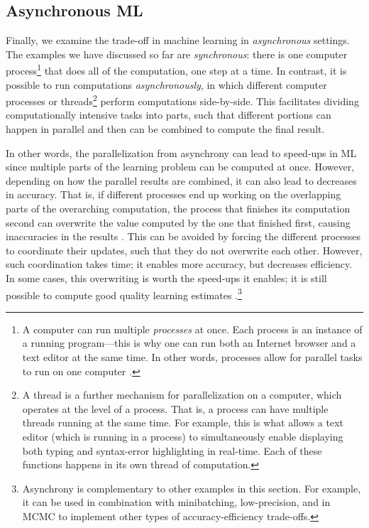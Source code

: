 \documentclass[sigplan,screen]{acmart}
\begin{document}
\subsection{Asynchronous ML} \label{sec:async}
Finally, we examine the trade-off in machine learning in \emph{asynchronous} settings. The examples we have discussed so far are \emph{synchronous}: there is one computer process\footnote{A computer can run multiple \emph{processes} at once. Each process is an instance of a running program---this is why one can run both an Internet browser and a text editor at the same time. In other words, processes allow for parallel tasks to run on one computer \cite{ArpaciDusseau2018os}.} that does all of the computation, one step at a time. In contrast, it is possible to run computations \emph{asynchronously}, in which different computer processes or threads\footnote{A thread is a further mechanism for parallelization on a computer, which operates at the level of a process. That is, a process can have multiple threads running at the same time. For example, this is what allows a text editor (which is running in a process) to simultaneously enable displaying both typing and syntax-error highlighting in real-time. Each of these functions happens in its own thread of computation.} perform computations side-by-side. This facilitates dividing computationally intensive tasks into parts, such that different portions can happen in parallel and then can be combined to compute the final result.

In other words, the parallelization from asynchrony can lead to speed-ups in ML since multiple parts of the learning problem can be computed at once. However, depending on how the parallel results are combined, it can also lead to decreases in accuracy. That is, if different processes end up working on the overlapping parts of the overarching computation, the process that finishes its computation second can overwrite the value computed by the one that finished first, causing inaccuracies in the results \cite{desa2017async, alistarh2018convergence, lian2017asynchronous, Niu2011hogwild}. This can be avoided by forcing the different processes to coordinate their updates, such that they do not overwrite each other. However, such coordination takes time; it enables more accuracy, but decreases efficiency. In some cases, this overwriting is worth the speed-ups it enables; it is still possible to compute good quality learning estimates \cite{desa2016gibbs, daskalakis2018gibbs}.\footnote{Asynchrony is complementary to other examples in this section. For example, it can be used in combination with minibatching, low-precision, and in MCMC to implement other types of accuracy-efficiency trade-offs.}
\\
\end{document}
